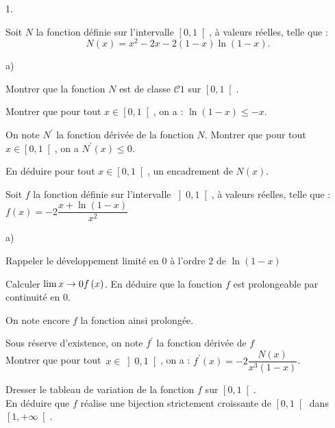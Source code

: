 \documentclass[11pt]{article}%
\begin{document}
\begin{noliste}{1.}
 \setlength{\itemsep}{4mm}
\item Soit $N$ la fonction définie sur l'intervalle $\left[ 0,1\right[
$, à valeurs réelles, telle que :
\[
 N\left( x\right) = x^{2}-2x-2\left( 1-x\right) \ln \left( 1-x\right).
\]

\begin{noliste}{a)}
 \setlength{\itemsep}{2mm}
\item Montrer que la fonction $N$ est de classe $\mathcal{C}{1}$ sur
$\left[
0,1\right[ $.

\item Montrer que pour tout $x\in\left[ 0,1\right[ $, on a : $\ln\left(
1-x\right) \leq-x$.

\item On note $N^{\prime}$ la fonction dérivée de la fonction $N$.
Montrer que pour tout $x\in\left[ 0,1\right[ $, on a $N^{\prime}\left(
x\right) \leq0$.

\item En déduire pour tout $x\in\left[ 0,1\right[ $, un encadrement de
$N(x)$.
\end{noliste}

\item Soit $f$ la fonction définie sur l'intervalle $\left] 0,1\right[
$, à valeurs réelles, telle que : $f\left( x\right) = -2\dfrac {x +
\ln\left( 1-x\right) }{x^{2}}$

\begin{noliste}{a)}
 \setlength{\itemsep}{2mm}
\item Rappeler le développement limité en 0 à l'ordre 2 de $\ln(1-x)$

\item Calculer $\lim{x\rightarrow0}f\left( x\right) $. En déduire que
la fonction $f$ est prolongeable par continuité en $0$.

On note encore $f$ la fonction ainsi prolongée.

\item Sous réserve d'existence, on note $f^{\prime}$ la fonction
dérivée de $f$\\
Montrer que pour tout\ $x\in\left] 0,1\right[ $, on a :
$f^{\prime}\left(
x\right) = -2\dfrac{N\left( x\right) }{x^{3}\left( 1-x\right) }$.

\item Dresser le tableau de variation de la fonction $f$ sur $\left[
0,1\right[ $.\\
En déduire que $f$ réalise une bijection strictement croissante de
$\left[ 0,1\right[ $ dans $\left[ 1, + \infty \right[ $.
\end{noliste}


\end{noliste}
\end{document}
